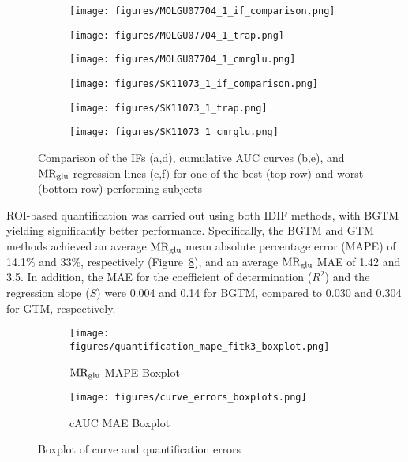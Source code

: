 \begin {figure}[h]
\centering
\begin{subfigure}[b]{0.322\textwidth}
	\texttt{[image: figures/MOLGU07704\_1\_if\_comparison.png]}
	\caption{}
	\label{subfig:good_if_compare}
\end{subfigure}
\begin{subfigure}[b]{0.322\textwidth}
	\texttt{[image: figures/MOLGU07704\_1\_trap.png]}
	\caption{}
	\label{subfig:good_trap_compare}
\end{subfigure}
\begin{subfigure}[b]{0.322\textwidth}
	\texttt{[image: figures/MOLGU07704\_1\_cmrglu.png]}
	\caption{}
	\label{fig:good_cmrglu}
\end{subfigure}
\begin{subfigure}[b]{0.322\textwidth}
	\texttt{[image: figures/SK11073\_1\_if\_comparison.png]}
	\caption{}
	\label{subfig:bad_if_compare}
\end{subfigure}
\begin{subfigure}[b]{0.322\textwidth}
	\texttt{[image: figures/SK11073\_1\_trap.png]}
	\caption{}
	\label{subfig:bad_trap_compare}
\end{subfigure}
\begin{subfigure}[b]{0.322\textwidth}
	\texttt{[image: figures/SK11073\_1\_cmrglu.png]}
	\caption{}
	\label{fig:bad_cmrglu}
\end{subfigure}
\caption{Comparison of the IFs (a,d), cumulative AUC curves (b,e), and $\text{MR}_{\text{glu}}$ regression lines (c,f) for one of the best (top row) and worst (bottom row) performing subjects}
\label{fig:ifs}
\end{figure}

ROI-based quantification was carried out using both IDIF methods, with BGTM yielding significantly better performance.
Specifically, the BGTM and GTM methods achieved an average \(\text{MR}_{\text{glu}}\) mean absolute percentage error (MAPE) of 14.1\% and 33\%, respectively (Figure~\ref{subfig:mape_boxplot}), and an average \(\text{MR}_{\text{glu}}\) MAE of 1.42 and 3.5.
In addition, the MAE for the coefficient of determination (\(R^2\)) and the regression slope (\(S\)) were 0.004 and 0.14 for BGTM, compared to 0.030 and 0.304 for GTM, respectively.

\begin{figure}
	\centering
	\begin{subfigure}[b]{0.45\textwidth}
		\texttt{[image: figures/quantification\_mape\_fitk3\_boxplot.png]}
		\caption{\(\text{MR}_{\text{glu}}\) MAPE Boxplot}
		\label{subfig:mape_boxplot}
	\end{subfigure}
	\begin{subfigure}[b]{0.45\textwidth}
		\texttt{[image: figures/curve\_errors\_boxplots.png]}
		\caption{cAUC MAE Boxplot}
		\label{subfig:cauc_boxplot}
	\end{subfigure}
	\caption{Boxplot of curve and quantification errors}
	\label{fig:boxplots}
\end{figure}

